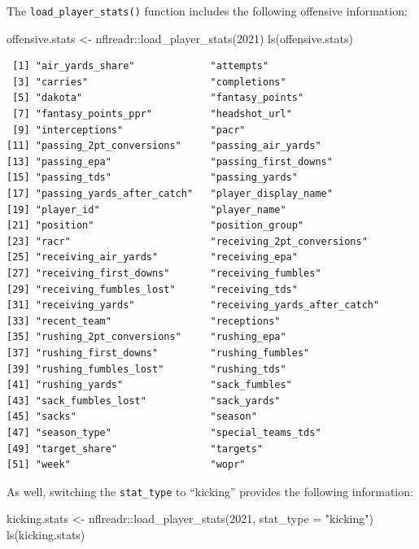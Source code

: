 \documentclass[
  letterpaper,
]{krantz}
\newenvironment{Shaded}{\begin{snugshade}}{\end{snugshade}}
\newcommand{\AttributeTok}[1]{\textcolor[rgb]{0.40,0.45,0.13}{#1}}
\newcommand{\DecValTok}[1]{\textcolor[rgb]{0.68,0.00,0.00}{#1}}
\newcommand{\FunctionTok}[1]{\textcolor[rgb]{0.28,0.35,0.67}{#1}}
\newcommand{\NormalTok}[1]{\textcolor[rgb]{0.00,0.23,0.31}{#1}}
\newcommand{\OtherTok}[1]{\textcolor[rgb]{0.00,0.23,0.31}{#1}}
\newcommand{\SpecialCharTok}[1]{\textcolor[rgb]{0.37,0.37,0.37}{#1}}
\newcommand{\StringTok}[1]{\textcolor[rgb]{0.13,0.47,0.30}{#1}}
\begin{document}
The \texttt{load\_player\_stats()} function includes the following
offensive information:

\begin{Shaded}
\begin{Highlighting}[]
\NormalTok{offensive.stats }\OtherTok{\textless{}{-}}\NormalTok{ nflreadr}\SpecialCharTok{::}\FunctionTok{load\_player\_stats}\NormalTok{(}\DecValTok{2021}\NormalTok{)}
\FunctionTok{ls}\NormalTok{(offensive.stats)}
\end{Highlighting}
\end{Shaded}

\begin{verbatim}
 [1] "air_yards_share"             "attempts"                   
 [3] "carries"                     "completions"                
 [5] "dakota"                      "fantasy_points"             
 [7] "fantasy_points_ppr"          "headshot_url"               
 [9] "interceptions"               "pacr"                       
[11] "passing_2pt_conversions"     "passing_air_yards"          
[13] "passing_epa"                 "passing_first_downs"        
[15] "passing_tds"                 "passing_yards"              
[17] "passing_yards_after_catch"   "player_display_name"        
[19] "player_id"                   "player_name"                
[21] "position"                    "position_group"             
[23] "racr"                        "receiving_2pt_conversions"  
[25] "receiving_air_yards"         "receiving_epa"              
[27] "receiving_first_downs"       "receiving_fumbles"          
[29] "receiving_fumbles_lost"      "receiving_tds"              
[31] "receiving_yards"             "receiving_yards_after_catch"
[33] "recent_team"                 "receptions"                 
[35] "rushing_2pt_conversions"     "rushing_epa"                
[37] "rushing_first_downs"         "rushing_fumbles"            
[39] "rushing_fumbles_lost"        "rushing_tds"                
[41] "rushing_yards"               "sack_fumbles"               
[43] "sack_fumbles_lost"           "sack_yards"                 
[45] "sacks"                       "season"                     
[47] "season_type"                 "special_teams_tds"          
[49] "target_share"                "targets"                    
[51] "week"                        "wopr"                       
\end{verbatim}

As well, switching the \texttt{stat\_type} to ``kicking'' provides the
following information:

\begin{Shaded}
\begin{Highlighting}[]
\NormalTok{kicking.stats }\OtherTok{\textless{}{-}}\NormalTok{ nflreadr}\SpecialCharTok{::}\FunctionTok{load\_player\_stats}\NormalTok{(}\DecValTok{2021}\NormalTok{, }\AttributeTok{stat\_type =} \StringTok{"kicking"}\NormalTok{)}
\FunctionTok{ls}\NormalTok{(kicking.stats)}
\end{Highlighting}
\end{Shaded}
\end{document}
